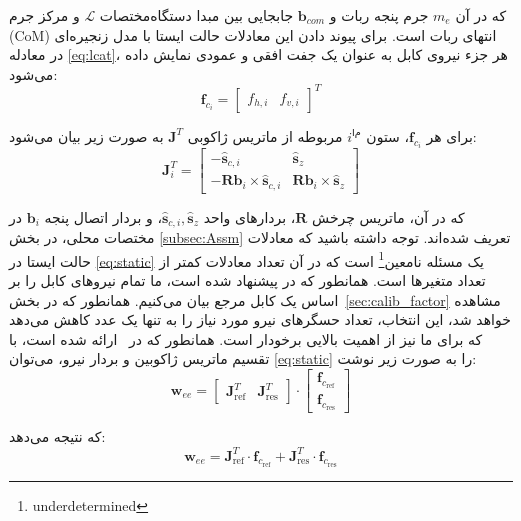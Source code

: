 که در آن $m_e$ جرم پنجه ربات و $\bm{b}_{com}$ جابجایی بین مبدا دستگاه‌مختصات $\mathcal{L}$ و مرکز جرم (CoM) انتهای ربات است. 
برای پیوند دادن این معادلات حالت ایستا با مدل زنجیره‌ای در معادله \eqref{eq:lcat}، هر جزء نیروی کابل به عنوان یک جفت افقی و عمودی نمایش داده می‌شود:  
\begin{equation}
	\mathbf{f}_{c_{i}}= \begin{bmatrix} f_{h,i} & f_{v,i} \end{bmatrix} ^T 
\end{equation}

برای هر $\mathbf{f}_{c_{i}}$، ستون $i^{ام}$ مربوطه از ماتریس ژاکوبی $\bm{J}^T$ به صورت زیر بیان می‌شود:
\begin{equation}
	\bm{J}^T_i= \begin{bmatrix} -\hat{\bm{s}}_{c,i} & \hat{\bm{s}}_{z} \\ -\bm{R}\bm{b}_{i} \times \hat{\bm{s}}_{c,i} & \bm{R}\bm{b}_{i} \times \hat{\bm{s}}_{z}  \end{bmatrix}
\end{equation}

که در آن، ماتریس چرخش $\bm{R}$، بردارهای واحد $\hat{\bm{s}}_{c,i}, \hat{\bm{s}}_{z}$، و بردار اتصال پنجه $\bm{b}_i$ در مختصات محلی، در بخش
\ref{subsec:Assm} 
تعریف شده‌اند. توجه داشته باشید که معادلات حالت ایستا در 
\ref{eq:static}
 یک مسئله نامعین\footnote{underdetermined}
است که در آن تعداد معادلات کمتر از تعداد متغیرها است. همانطور که در \cite{allak2022kinematics} پیشنهاد شده است، ما تمام نیروهای کابل را بر اساس یک کابل مرجع بیان می‌کنیم. همانطور که در بخش~\ref{sec:calib_factor} مشاهده خواهد شد، این انتخاب، تعداد حسگرهای نیرو مورد نیاز را به تنها یک عدد کاهش می‌دهد که برای ما نیز از اهمیت بالایی برخودار است. همانطور که در~\cite{borgstrom2009nims, allak2022kinematics} ارائه شده است، با تقسیم ماتریس ژاکوبین و بردار نیرو، می‌توان
 \ref{eq:static} 
 را به صورت زیر نوشت:
\begin{equation} \label{eq:wrench-jac-force}
	\mathbf{w}_{ee} = \begin{bmatrix} \bm{J}^T_{\text{ref}} & \bm{J}^T_{\text{res}} \end{bmatrix} \cdot \begin{bmatrix} \mathbf{f}_{c_{\text{ref}}} \\ \mathbf{f}_{c_{\text{res}}} \end{bmatrix} 
\end{equation} 

که نتیجه می‌دهد:
\begin{equation} \label{eq:jacobian-distribution}
	\mathbf{w}_{ee} = \bm{J}_{\text{ref}}^T \cdot \mathbf{f}_{c_{\text{ref}}} + \bm{J}_{\text{res}}^T \cdot \mathbf{f}_{c_{\text{res}}} 
\end{equation}

